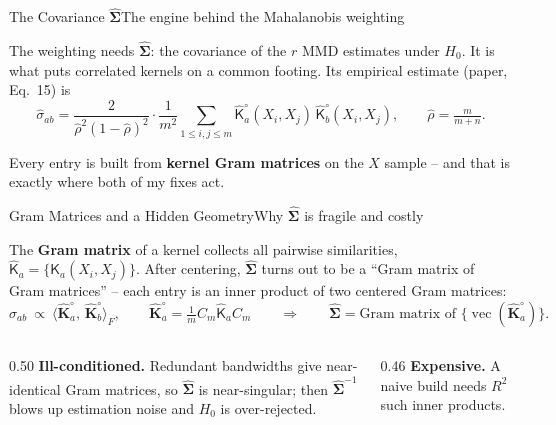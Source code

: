 \documentclass[aspectratio=169,10pt]{beamer}
\newcommand{\warn}[1]{\textcolor{accentorange}{#1}}
\newcommand{\sfK}{\mathsf{K}}                      %
\newcommand{\Sig}{\hat{\boldsymbol{\Sigma}}}        %
\newcommand{\Kcg}{\hat{\mathbf{K}}^{\circ}}         %
\newcommand{\rhohat}{\hat{\rho}}
\begin{document}
\begin{frame}{The Covariance $\Sig$}{The engine behind the Mahalanobis weighting}

\vspace{0.04cm}
The weighting needs $\Sig$: the covariance of the $r$ MMD estimates under $H_0$. It is
what puts correlated kernels on a common footing. Its empirical estimate (paper, Eq.~15) is
\[
  \hat\sigma_{ab}
  =\frac{2}{\rhohat^{2}(1-\rhohat)^{2}}\cdot\frac{1}{m^{2}}
   \sum_{1\le i,j\le m}\hat{\sfK}^{\circ}_a(X_i,X_j)\,\hat{\sfK}^{\circ}_b(X_i,X_j),
  \qquad \rhohat=\tfrac{m}{m+n}.
\]

\vspace{0.20cm}
Every entry is built from \textbf{kernel Gram matrices} on the $X$ sample -- and that is
exactly where both of my fixes act.

\end{frame}

\begin{frame}{Gram Matrices and a Hidden Geometry}{Why $\Sig$ is fragile and costly}

\vspace{0.04cm}
The \textbf{Gram matrix} of a kernel collects all pairwise similarities,
$\hat{\sfK}_a=\{\sfK_a(X_i,X_j)\}$. After centering, $\Sig$ turns out to be a
``Gram matrix of Gram matrices'' -- each entry is an inner product of two centered
Gram matrices:
\[
  \hat\sigma_{ab}\ \propto\ \big\langle \Kcg_a,\,\Kcg_b\big\rangle_F,
  \qquad \Kcg_a=\tfrac1m C_m\hat{\sfK}_aC_m
  \qquad\Longrightarrow\qquad
  \Sig=\text{Gram matrix of }\{\operatorname{vec}(\Kcg_a)\}.
\]

\vspace{0.18cm}
\begin{columns}[T,totalwidth=\linewidth]
\begin{column}{0.50\linewidth}
\textbf{\warn{Ill-conditioned.}} Redundant bandwidths give near-identical Gram matrices,
so $\Sig$ is near-singular; then $\Sig^{-1}$ blows up estimation noise and $H_0$ is
over-rejected.
\end{column}
\begin{column}{0.46\linewidth}
\textbf{\warn{Expensive.}} A naive build needs $R^2$ such inner products.
\end{column}
\end{columns}

\end{frame}
\end{document}
